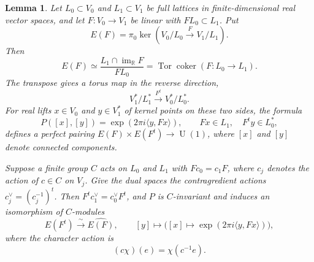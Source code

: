 \documentclass[11pt,a4paper,reqno]{amsart}
\theoremstyle{plain}
\newtheorem{lemma}[theorem]{Lemma}
\theoremstyle{definition}
\theoremstyle{remark}
\numberwithin{equation}{section}
\DeclareMathOperator{\im}{im}
\newcommand{\UU}{\operatorname{U}}
\newcommand{\RR}{\mathbb R}
\newcommand{\pair}[2]{\langle #1,#2\rangle}
\DeclareMathOperator{\coker}{coker}
\DeclareMathOperator{\Tor}{Tor}
\newcommand{\eexp}[1]{\exp(2\pi i #1)}
\begin{document}
\begin{lemma}\label{lem:lattice} Let $L_0\subset V_0$ and $L_1\subset V_1$ be full lattices in finite-dimensional real vector spaces, and let $F\colon V_0\to V_1$ be linear with $FL_0\subset L_1$. Put
\[
E(F)=\pi_0\ker(V_0/L_0\xrightarrow{F}V_1/L_1).
\]
Then
\begin{equation}\label{eq:torsion}
E(F)\simeq\frac{L_1\cap\im_{\RR} F}{FL_0} =\Tor\coker(F\colon L_0\to L_1).
\end{equation}
The transpose gives a torus map in the reverse direction,
\[
V_1^*/L_1^*\xrightarrow{F^t}V_0^*/L_0^*.
\]
For real lifts $x\in V_0$ and $y\in V_1^*$ of kernel points on these two sides, the formula
\begin{equation}\label{eq:pairing}
P([x],[y])=\eexp{\pair{y}{Fx}},\qquad Fx\in L_1,\quad F^ty\in L_0^*,
\end{equation}
defines a perfect pairing $E(F)\times E(F^t)\to\UU(1)$, where $[x]$ and $[y]$ denote connected components.

Suppose a finite group $C$ acts on $L_0$ and $L_1$ with $F c_0=c_1 F$, where $c_j$ denotes the action of $c\in C$ on $V_j$. Give the dual spaces the contragredient actions $c_j^\vee=(c_j^{-1})^t$. Then $F^t c_1^\vee=c_0^\vee F^t$, and $P$ is $C$-invariant and induces an isomorphism of $C$-modules
\[
E(F^t)\xrightarrow{\ \sim\ }\widehat{E(F)},\qquad [y]\longmapsto \bigl([x]\longmapsto\eexp{\pair{y}{Fx}}\bigr),
\]
where the character action is
\begin{equation}\label{eq:dualaction}
(c\chi)(e)=\chi(c^{-1}e).
\end{equation}
\end{lemma}
\end{document}
